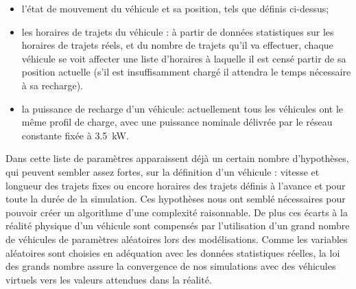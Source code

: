 \begin{itemize}
				\item l'état de mouvement du véhicule et sa position, tels que définis ci-dessus;
				\item les horaires de trajets du véhicule : à partir de données statistiques sur les horaires de trajets réels, et du nombre de trajets qu'il va effectuer, chaque véhicule se voit affecter une liste d'horaires à laquelle il est censé partir de sa position actuelle (s'il est insuffisamment chargé il attendra le temps nécessaire à sa recharge).
				\item la puissance de recharge d'un véhicule: actuellement tous les véhicules ont le même profil de charge, avec une puissance nominale délivrée par le réseau constante fixée à \SI{3,5}{\kilo\watt}.
			\end{itemize}
			
			Dans cette liste de paramètres apparaissent déjà un certain nombre d'hypothèses, qui peuvent sembler assez fortes, sur la définition d'un véhicule : vitesse et longueur des trajets fixes ou encore horaires des trajets définis à l'avance et pour toute la durée de la simulation.
			Ces hypothèses nous ont semblé nécessaires pour pouvoir créer un algorithme d'une complexité raisonnable. De plus ces écarts à la réalité physique d'un véhicule sont compensés par l'utilisation d'un grand nombre de véhicules de paramètres aléatoires lors des modélisations. Comme les variables aléatoires sont choisies en adéquation avec les données statistiques réelles, la loi des grands nombre assure la convergence de nos simulations avec des véhicules virtuels vers les valeurs attendues dans la réalité.
		
